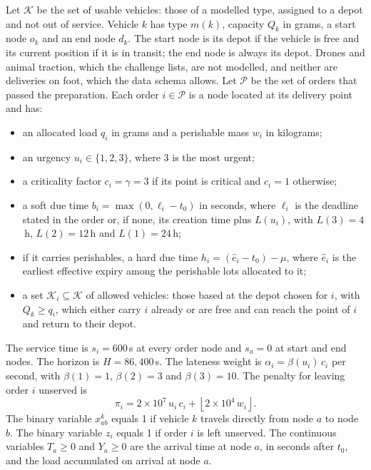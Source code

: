 \documentclass[11pt]{article}
\begin{document}
Let $\mathcal{K}$ be the set of usable vehicles: those of a modelled type, assigned to a depot and not out of service. %
Vehicle $k$ has type $m(k)$, capacity $Q_k$ in grams, a start node $o_k$ and an end node $d_k$. The start node is its depot if the vehicle is free and its current position if it is in transit; the end node is always its depot. Drones and animal traction, which the challenge lists, are not modelled, and neither are deliveries on foot, which the data schema allows. Let $\mathcal{P}$ be the set of orders that passed the preparation. Each order $i\in\mathcal{P}$ is a node located at its delivery point and has:
\begin{itemize}
\item an allocated load $q_i$ in grams and a perishable mass $w_i$ in kilograms;
\item an urgency $u_i\in\{1,2,3\}$, where 3 is the most urgent;
\item a criticality factor $c_i=\gamma=3$ if its point is critical and $c_i=1$ otherwise;
\item a soft due time $b_i=\max(0,\ell_i-t_0)$ in seconds, where $\ell_i$ is the deadline stated in the order or, if none, its creation time plus $L(u_i)$, with $L(3)=4$\,h, $L(2)=12$\,h and $L(1)=24$\,h;
\item if it carries perishables, a hard due time $h_i=(\hat e_i - t_0)-\mu$, where $\hat e_i$ is the earliest effective expiry among the perishable lots allocated to it;
\item a set $\mathcal{K}_i\subseteq\mathcal{K}$ of allowed vehicles: those based at the depot chosen for $i$, with $Q_k\geq q_i$, which either carry $i$ already or are free and can reach the point of $i$ and return to their depot.
\end{itemize}
The service time is $s_i=600$\,s at every order node and $s_a=0$ at start and end nodes. The horizon is $H=86{,}400$\,s. The lateness weight is $\alpha_i=\beta(u_i)\,c_i$ per second, with $\beta(1)=1$, $\beta(2)=3$ and $\beta(3)=10$. The penalty for leaving order $i$ unserved is
\begin{equation}
\pi_i = 2\times 10^{7}\,u_i\,c_i + \left\lfloor 2\times 10^{4}\,w_i \right\rfloor .
\end{equation}
The binary variable $x^k_{ab}$ equals 1 if vehicle $k$ travels directly from node $a$ to node $b$. The binary variable $z_i$ equals 1 if order $i$ is left unserved. The continuous variables $T_a\geq 0$ and $Y_a\geq 0$ are the arrival time at node $a$, in seconds after $t_0$, and the load accumulated on arrival at node $a$.
\end{document}
